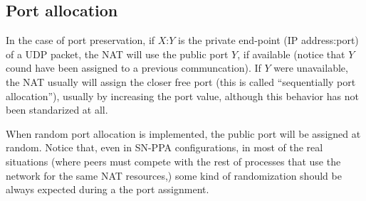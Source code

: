 \subsection{Port allocation}
In the case of port preservation, if $X$:$Y$ is the private end-point
(IP address:port) of a UDP packet, the NAT will use the public port
$Y$, if available (notice that $Y$ cound have been assigned to a
previous communcation). If $Y$ were unavailable, the NAT usually will
assign the closer free port (this is called ``sequentially port
allocation''), usually by increasing the port value, although this
behavior has not been standarized at all.

When random port allocation is implemented, the public port will be
assigned at random. Notice that, even in SN-PPA configurations, in
most of the real situations (where peers must compete with the rest of
processes that use the network for the same NAT resources,) some kind
of randomization should be always expected during a the port
assignment.

